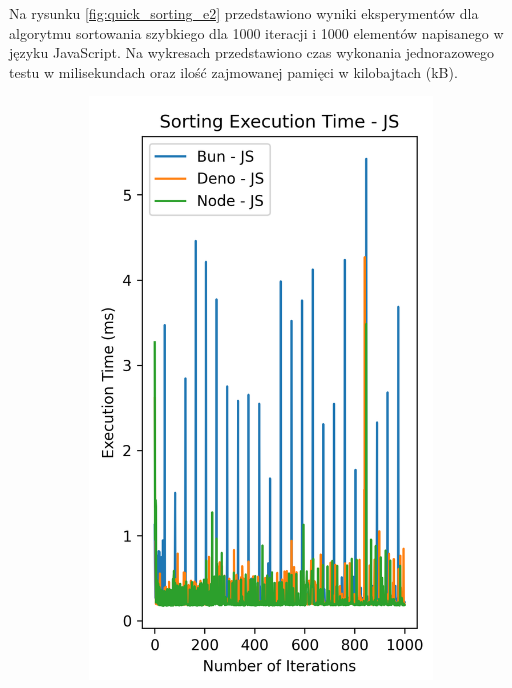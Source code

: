 Na rysunku \ref{fig:quick_sorting_e2} przedstawiono wyniki eksperymentów dla algorytmu sortowania szybkiego dla 1000 iteracji i 1000 elementów napisanego w języku JavaScript. Na wykresach przedstawiono czas wykonania jednorazowego testu w milisekundach oraz ilość zajmowanej pamięci w kilobajtach (kB).

\begin{figure}[H]
  \centering
  \begin{subfigure}[b]{0.42\textwidth}
    \centering
    \includegraphics[width=\textwidth]{Figures/sorting/sorting_quick_1000_1000_js_time.png}

\end{subfigure}
\end{figure}
